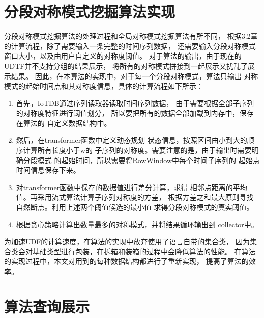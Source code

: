 \section{分段对称模式挖掘算法实现}
分段对称模式挖掘算法的处理过程和全局对称模式挖掘算法有所不同，
根据3.2章的计算流程，除了需要输入一条完整的时间序列数据，
还需要输入分段对称模式窗口大小，以及由用户自定义的对称度阈值。
对于算法的输出，由于现在的UDTF并不支持分组的结果展示，
将所有的对称模式拼接到一起展示又扰乱了展示结果。
因此，在本算法的实现中，对于每一个分段对称模式，算法只输出
对称模式的起始时间点和其对称度信息，具体的计算流程如下所示：
\begin{enumerate}
    \item 首先，IoTDB通过序列读取器读取时间序列数据，
    由于需要根据全部子序列的对称度特征进行阈值划分，
    所以要把所有的数据全部加载到内存中，保存在算法的
    自定义数据结构中。
    \item 然后，在transformer函数中定义动态规划
    状态信息，按照区间由小到大的顺序计算所有长度小于w的
    子序列的对称度。需要注意的是，由于输出时需要明确分段模式
    的起始时间，所以需要将RowWindow中每个时间子序列的
    起始点时间信息保存下来。
    \item 对transformer函数中保存的数据值进行差分计算，求得
    相邻点距离的平均值。再采用流式算法计算子序列对称度的方差，
    根据方差之和最大原则寻找自然断点。利用上述两个阈值候选的最小值
    求得分段对称模式的真实阈值。
    \item 根据贪心策略计算出数量最多的对称模式，并将结果循环输出到
    collector中。
\end{enumerate}

为加速UDF的计算速度，在算法的实现中放弃使用了语言自带的集合类，
因为集合类会对基础类型进行包装，在拆箱和装箱的过程中会降低算法的性能。
在算法的实现过程中，本文对用到的每种数据结构都进行了重新实现，
提高了算法的效率。

\section{算法查询展示}

